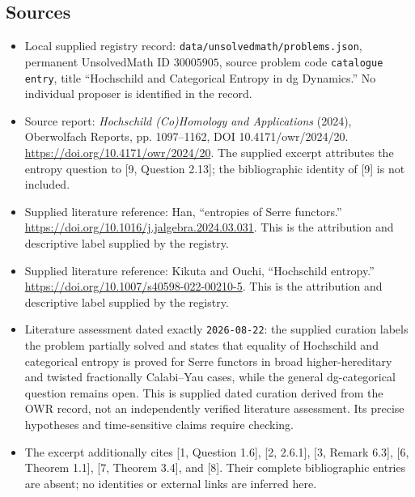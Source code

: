 \documentclass[11pt]{article}
\begin{document}
\subsection{Sources}
\begin{itemize}
\item Local supplied registry record: \texttt{data/unsolvedmath/problems.json}, permanent UnsolvedMath ID \(30005905\), source problem code \texttt{catalogue entry}, title ``Hochschild and Categorical Entropy in dg Dynamics.'' No individual proposer is identified in the record.
\item Source report: \emph{Hochschild (Co)Homology and Applications} (2024), Oberwolfach Reports, pp. 1097--1162, DOI 10.4171/owr/2024/20. \url{https://doi.org/10.4171/owr/2024/20}. The supplied excerpt attributes the entropy question to [9, Question 2.13]; the bibliographic identity of [9] is not included.
\item Supplied literature reference: Han, ``entropies of Serre functors.'' \url{https://doi.org/10.1016/j.jalgebra.2024.03.031}. This is the attribution and descriptive label supplied by the registry.
\item Supplied literature reference: Kikuta and Ouchi, ``Hochschild entropy.'' \url{https://doi.org/10.1007/s40598-022-00210-5}. This is the attribution and descriptive label supplied by the registry.
\item Literature assessment dated exactly \texttt{2026-08-22}: the supplied curation labels the problem partially solved and states that equality of Hochschild and categorical entropy is proved for Serre functors in broad higher-hereditary and twisted fractionally Calabi--Yau cases, while the general dg-categorical question remains open. This is supplied dated curation derived from the OWR record, not an independently verified literature assessment. Its precise hypotheses and time-sensitive claims require checking.
\item The excerpt additionally cites [1, Question 1.6], [2, 2.6.1], [3, Remark 6.3], [6, Theorem 1.1], [7, Theorem 3.4], and [8]. Their complete bibliographic entries are absent; no identities or external links are inferred here.
\end{itemize}
\end{document}
